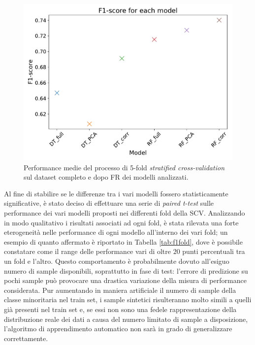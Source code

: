 \begin{figure}
	\centering
	\includegraphics[width=1\linewidth]{images/fscore}
	\caption{Performance medie del processo di 5-fold \textit{stratified cross-validation} sul dataset completo e dopo FR dei modelli analizzati.}
	\label{fig:fscore}
\end{figure}
Al fine di stabilire se le differenze tra i vari modelli fossero statisticamente significative, è stato deciso di effettuare una serie di \textit{paired t-test} sulle performance dei vari modelli proposti nei differenti fold della SCV.
Analizzando in modo qualitativo i risultati associati ad ogni fold, è stata rilevata una forte eterogeneità nelle performance di ogni modello all'interno dei vari fold; un esempio di quanto affermato è riportato in Tabella \ref{tab:f1fold}, dove è possibile constatare come il range delle performance vari di oltre $20$ punti percentuali tra un fold e l'altro. Questo comportamento è probabilmente dovuto all'esiguo numero di sample disponibili, soprattutto in fase di test: l'errore di predizione su pochi sample può provocare una drastica variazione della misura di performance considerata. Pur aumentando in maniera artificiale il numero di sample della classe minoritaria nel train set, i sample sintetici risulteranno molto simili a quelli già presenti nel train set e, se essi non sono una fedele rappresentazione della distribuzione reale dei dati a causa del numero limitato di sample a disposizione, l'algoritmo di apprendimento automatico non sarà in grado di generalizzare correttamente. 
